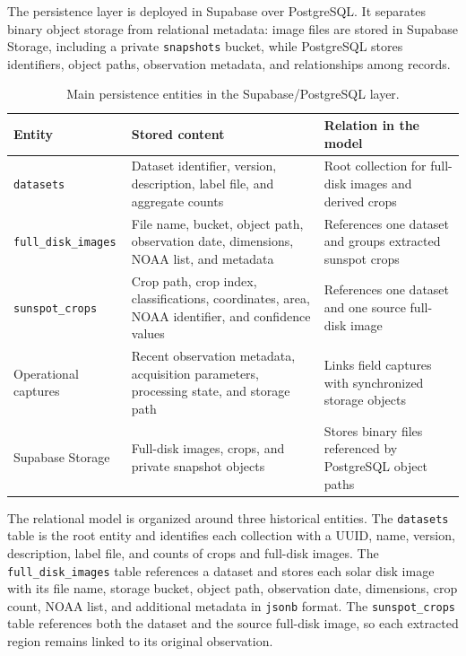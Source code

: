 \documentclass[conference,a4paper]{IEEEtran}
\begin{document}
The persistence layer is deployed in Supabase over PostgreSQL. It separates binary object storage from relational metadata: image files are stored in Supabase Storage, including a private \texttt{snapshots} bucket, while PostgreSQL stores identifiers, object paths, observation metadata, and relationships among records.

\begin{table}[t]
\caption{Main persistence entities in the Supabase/PostgreSQL layer.}
\label{tab:supabase-entities}
\centering
\begin{tabular}{p{}p{}p{}}
\hline
\textbf{Entity} & \textbf{Stored content} & \textbf{Relation in the model} \\
\hline
\texttt{datasets} & Dataset identifier, version, description, label file, and aggregate counts & Root collection for full-disk images and derived crops \\
\texttt{full\_disk\_images} & File name, bucket, object path, observation date, dimensions, NOAA list, and metadata & References one dataset and groups extracted sunspot crops \\
\texttt{sunspot\_crops} & Crop path, crop index, classifications, coordinates, area, NOAA identifier, and confidence values & References one dataset and one source full-disk image \\
Operational captures & Recent observation metadata, acquisition parameters, processing state, and storage path & Links field captures with synchronized storage objects \\
Supabase Storage & Full-disk images, crops, and private snapshot objects & Stores binary files referenced by PostgreSQL object paths \\
\hline
\end{tabular}
\end{table}

The relational model is organized around three historical entities. The \texttt{datasets} table is the root entity and identifies each collection with a UUID, name, version, description, label file, and counts of crops and full-disk images. The \texttt{full\_disk\_images} table references a dataset and stores each solar disk image with its file name, storage bucket, object path, observation date, dimensions, crop count, NOAA list, and additional metadata in \texttt{jsonb} format. The \texttt{sunspot\_crops} table references both the dataset and the source full-disk image, so each extracted region remains linked to its original observation.
\end{document}
